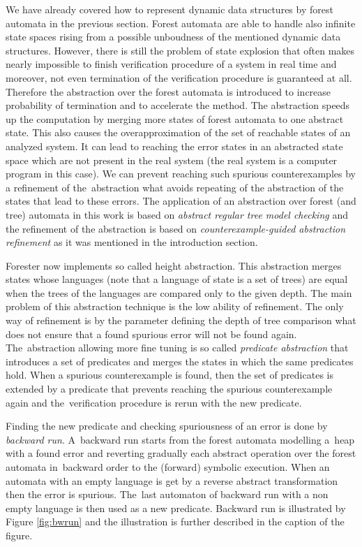 \documentclass[fleqn,11pt]{ExcelAtFIT} %
\begin{document}
We have already covered how to represent dynamic data structures by forest automata in the previous section.
Forest automata are able to handle also infinite state spaces
rising from a possible unboudness of the mentioned dynamic data structures.
However, there is still the problem of state explosion that often makes
nearly impossible to finish verification procedure of a system in real time
and moreover, not even termination of the verification procedure is guaranteed at all.
Therefore the abstraction over the forest automata is introduced to increase probability of termination
and to accelerate the method.
The abstraction speeds up the computation by merging more states
of forest automata to one abstract state.
This also causes the overapproximation of the set of reachable
states of an analyzed system.
It can lead to reaching the error states in
an abstracted state space which are not present in the real system (the real system is a computer program in this case).
We can prevent reaching such spurious counterexamples by a refinement of the~abstraction
what avoids repeating of the abstraction of the states that lead to these errors.
The application of an abstraction over forest (and tree) automata in this work is based on \emph{abstract regular tree model checking} \cite{artmc}
and the refinement of the abstraction is based on \emph{counterexample-guided abstraction refinement} \cite{cegar}
as it was mentioned in the introduction section.

Forester now implements so called height abstraction.
This abstraction merges states whose languages (note that a language of state is a set of trees) are equal
when the trees of the languages are compared only to the given depth.
The main problem of this abstraction technique is the low ability of refinement.
The only way of refinement is by the parameter defining the depth of tree comparison
what does not ensure that a found spurious error will not be found again.
The~abstraction allowing more fine tuning is so called \emph{predicate abstraction} \cite{artmc}
that introduces a set of predicates and merges the states in which the same predicates hold.
When a spurious counterexample is found, then the set of predicates is extended by
a predicate that prevents reaching the spurious counterexample again
and the~verification procedure is rerun with the new predicate.

Finding the new predicate and checking spuriousness of an error is done by \emph{backward run}.
A~backward run starts from the forest automata modelling a~heap with a found error and
reverting gradually each abstract operation over the forest automata
in~backward order to the (forward) symbolic execution.
When an automata with an empty language is get by a reverse abstract transformation then the error is spurious.
The~last automaton of backward run with a non empty language is then used as a new predicate.
Backward run is illustrated by Figure \ref{fig:bwrun} and the illustration
is further described in the caption of the figure.
\end{document}
